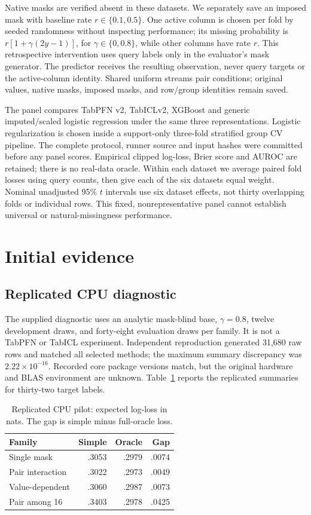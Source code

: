 \documentclass[10pt]{article}
\begin{document}
Native masks are verified absent in these datasets. We separately save an imposed mask with baseline rate $r\in\{0.1,0.5\}$. One active column is chosen per fold by seeded randomness without inspecting performance; its missing probability is $r[1+\gamma(2y-1)]$, for $\gamma\in\{0,0.8\}$, while other columns have rate $r$. This retrospective intervention uses query labels only in the evaluator's mask generator. The predictor receives the resulting observation, never query targets or the active-column identity. Shared uniform streams pair conditions; original values, native masks, imposed masks, and row/group identities remain saved.

The panel compares TabPFN v2, TabICLv2, XGBoost and generic imputed/scaled logistic regression under the same three representations. Logistic regularization is chosen inside a support-only three-fold stratified group CV pipeline. The complete protocol, runner source and input hashes were committed before any panel scores. Empirical clipped log-loss, Brier score and AUROC are retained; there is no real-data oracle. Within each dataset we average paired fold losses using query counts, then give each of the six datasets equal weight. Nominal unadjusted 95\% $t$ intervals use six dataset effects, not thirty overlapping folds or individual rows. This fixed, nonrepresentative panel cannot establish universal or natural-missingness performance.

\section{Initial evidence}
\subsection{Replicated CPU diagnostic}
The supplied diagnostic uses an analytic mask-blind base, $\gamma=0.8$, twelve development draws, and forty-eight evaluation draws per family. It is not a TabPFN or TabICL experiment. Independent reproduction generated 31,680 raw rows and matched all selected methods; the maximum summary discrepancy was $2.22\times10^{-16}$. Recorded core package versions match, but the original hardware and BLAS environment are unknown. Table~\ref{tab:pilot} reports the replicated summaries for thirty-two target labels.

\begin{table}[t]
\centering\small
\caption{Replicated CPU pilot: expected log-loss in nats. The gap is simple minus full-oracle loss.}
\label{tab:pilot}
\begin{tabular}{@{}lrrr@{}}
\toprule
Family & Simple & Oracle & Gap\\
\midrule
Single mask & .3053 & .2979 & .0074\\
Pair interaction & .3022 & .2973 & .0049\\
Value-dependent & .3060 & .2987 & .0073\\
Pair among 16 & .3403 & .2978 & .0425\\
\bottomrule
\end{tabular}
\end{table}
\end{document}
